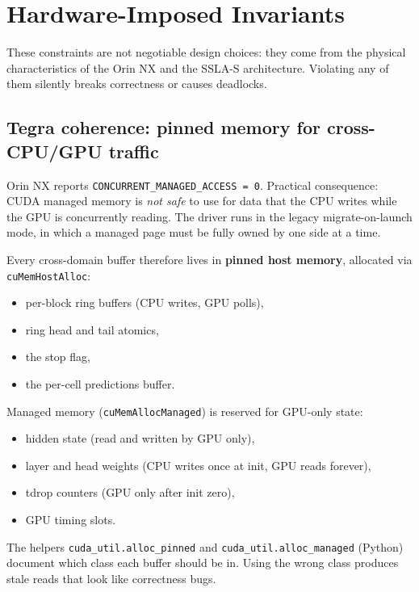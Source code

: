 \documentclass[11pt,a4paper]{article}
\begin{document}
\section{Hardware-Imposed Invariants}

These constraints are not negotiable design choices: they come from
the physical characteristics of the Orin NX and the SSLA-S architecture.
Violating any of them silently breaks correctness or causes deadlocks.

\subsection{Tegra coherence: pinned memory for cross-CPU/GPU traffic}

Orin NX reports \texttt{CONCURRENT\_MANAGED\_ACCESS = 0}. Practical
consequence: CUDA managed memory is \emph{not safe} to use for data that
the CPU writes while the GPU is concurrently reading. The driver runs
in the legacy migrate-on-launch mode, in which a managed page must be
fully owned by one side at a time.

Every cross-domain buffer therefore lives in \textbf{pinned host memory},
allocated via \texttt{cuMemHostAlloc}:

\begin{itemize}[itemsep=0pt]
  \item per-block ring buffers (CPU writes, GPU polls),
  \item ring head and tail atomics,
  \item the stop flag,
  \item the per-cell predictions buffer.
\end{itemize}

Managed memory (\texttt{cuMemAllocManaged}) is reserved for GPU-only state:

\begin{itemize}[itemsep=0pt]
  \item hidden state (read and written by GPU only),
  \item layer and head weights (CPU writes once at init, GPU reads forever),
  \item tdrop counters (GPU only after init zero),
  \item GPU timing slots.
\end{itemize}

The helpers \texttt{cuda\_util.alloc\_pinned} and
\texttt{cuda\_util.alloc\_managed} (Python) document which class each
buffer should be in. Using the wrong class produces stale reads that
look like correctness bugs.
\end{document}
